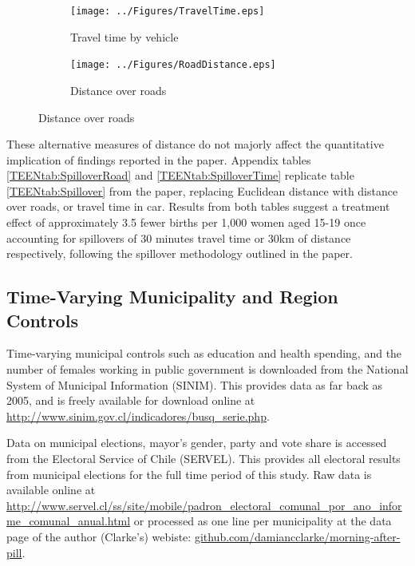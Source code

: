 \documentclass[11pt,subeqn]{article}
\begin{document}
\begin{spacing}{1.4}
\begin{figure}[htpb!]
\begin{center}
\caption{Alternative Measures of Distance to Treatment}
\label{altdist}
\begin{subfigure}{.5\textwidth}
  \centering
  \texttt{[image: ../Figures/TravelTime.eps]}
  \caption{Travel time by vehicle}
  \label{travelTime}
\end{subfigure}%
\begin{subfigure}{.5\textwidth}
  \centering
  \texttt{[image: ../Figures/RoadDistance.eps]}
  \caption{Distance over roads}
  \label{roadDist}
\end{subfigure}
\end{center}
\vspace{-4mm}
\end{figure}

These alternative measures of distance do not majorly affect the quantitative 
implication of findings reported in the paper.  Appendix tables 
\ref{TEENtab:SpilloverRoad} and \ref{TEENtab:SpilloverTime} replicate table 
\ref{TEENtab:Spillover} from the paper, replacing Euclidean distance with 
distance over roads, or travel time in car. Results from both tables suggest 
a treatment effect of approximately 3.5 fewer births per 1,000 women aged
15-19 once accounting for spillovers of 30 minutes travel time or
30km of distance respectively, following the spillover methodology outlined
in the paper.

\clearpage
\subsection{Time-Varying Municipality and Region Controls}
Time-varying municipal controls such as education and health spending, and the
number of females working in public government is downloaded from the National
System of Municipal Information (SINIM).  This provides data as far back as
2005, and is freely available for download online at
\url{http://www.sinim.gov.cl/indicadores/busq_serie.php}.

Data on municipal elections, mayor's gender, party and vote share is accessed
from the Electoral Service of Chile (SERVEL).  This provides all electoral
results from municipal elections for the full time period of this study.  Raw
data is available online at 
\url{http://www.servel.cl/ss/site/mobile/padron_electoral_comunal_por_ano_informe_comunal_anual.html}
or processed as one line per municipality at the data page of the author
(Clarke's) webiste: \url{github.com/damiancclarke/morning-after-pill}.


\end{spacing}
\end{document}
